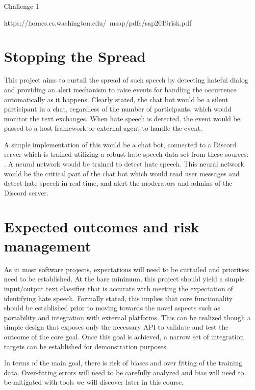\documentclass[conference]{sig-alternate-05-2015}
\begin{document}
Challenge 1

https://homes.cs.washington.edu/~msap/pdfs/sap2019risk.pdf



\section{Stopping the Spread}\label{sec:design}
This project aims to curtail the spread of such speech by detecting hateful dialog and providing an alert mechanism to raise events for handling the occurrence automatically as it happens.  Clearly stated, the chat bot would be a silent participant in a chat, regardless of the number of participants, which would monitor the text exchanges.  When hate speech is detected, the event would be passed to a host framework or external agent to handle the event.

A simple implementation of this would be a chat bot, connected to a Discord server which is trained utilizing a robust hate speech data set from these sources: \cite{Kaggle}\cite{HateSpeech}. A neural network would be trained to detect hate speech. This neural network would be the critical part of the chat bot which would read user messages and detect hate speech in real time, and alert the moderators and admins of the Discord server.

\color{black}


\section{Expected outcomes and risk management}

As in most software projects, expectations will need to be curtailed and priorities need to be established.  At the bare minimum, this project should yield a simple input/output text classifier that is accurate with meeting the expectation of identifying hate speech.  Formally stated, this implies that core functionality should be established prior to moving towards the novel aspects such as portability and integration with external platforms.  This can be realized though a simple design that exposes only the necessary API to validate and test the outcome of the core goal.  Once this goal is achieved, a narrow set of integration targets can be established for demonstration purposes.

In terms of the main goal, there is risk of biases and over fitting of the training data.  Over-fitting errors will need to be carefully analyzed and bias will need to be mitigated with tools we will discover later in this course.
\end{document}

